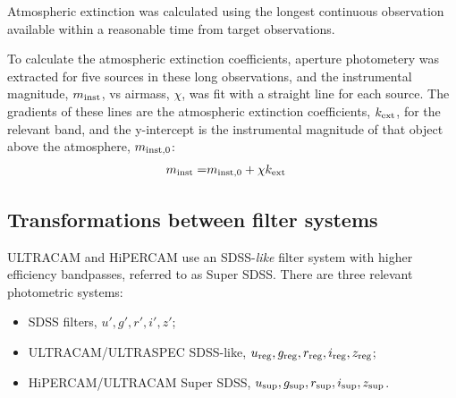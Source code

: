 Atmospheric extinction was calculated using the longest continuous observation available within a reasonable time from target observations.

To calculate the atmospheric extinction coefficients, aperture photometery was extracted for five sources in these long observations, and the instrumental magnitude, $m_{\rm inst}$, vs airmass, $\chi$, was fit with a straight line for each source.
The gradients of these lines are the atmospheric extinction coefficients, $k_{\rm ext}$, for the relevant band, and the y-intercept is the instrumental magnitude of that object above the atmosphere, $m_{\rm inst,0}$:
\begin{align}
    \label{eqn:observations:basic magnitude equation}
    m_{\rm inst} =& m_{\rm inst,0} + \chi k_{\rm ext}
\end{align}



\subsection{Transformations between filter systems}
\label{sect:observations:colour correction method}

ULTRACAM and HiPERCAM use an SDSS-\emph{like} filter system with higher efficiency bandpasses, referred to as Super SDSS. There are three relevant photometric systems:
\begin{itemize}
\item SDSS filters, $u', g', r', i', z'$;
\item ULTRACAM/ULTRASPEC SDSS-like, $u_{\rm reg}, g_{\rm reg}, r_{\rm reg}, i_{\rm reg}, z_{\rm reg}$;
\item HiPERCAM/ULTRACAM Super SDSS, $u_{\rm sup}, g_{\rm sup}, r_{\rm sup}, i_{\rm sup}, z_{\rm sup}$.
\end{itemize}

